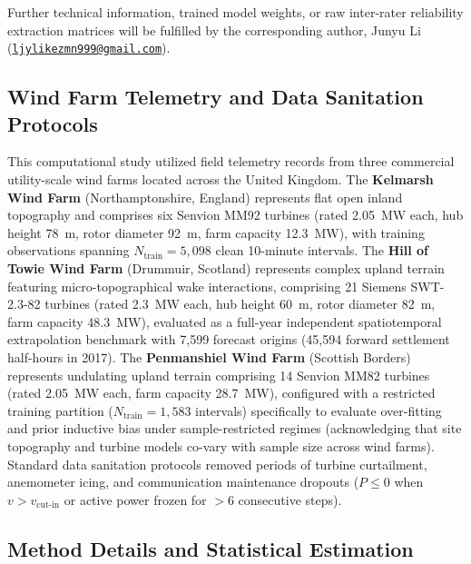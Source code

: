 Further technical information, trained model weights, or raw inter-rater reliability extraction matrices will be fulfilled by the corresponding author, Junyu Li (\href{mailto:ljylikezmn999@gmail.com}{\texttt{ljylikezmn999@gmail.com}}).

\subsection{Wind Farm Telemetry and Data Sanitation Protocols}
This computational study utilized field telemetry records from three commercial utility-scale wind farms located across the United Kingdom. The \textbf{Kelmarsh Wind Farm} (Northamptonshire, England) represents flat open inland topography and comprises six Senvion MM92 turbines (rated 2.05~MW each, hub height 78~m, rotor diameter 92~m, farm capacity 12.3~MW), with training observations spanning $N_{\text{train}} = 5,098$ clean 10-minute intervals. The \textbf{Hill of Towie Wind Farm} (Drummuir, Scotland) represents complex upland terrain featuring micro-topographical wake interactions, comprising 21 Siemens SWT-2.3-82 turbines (rated 2.3~MW each, hub height 60~m, rotor diameter 82~m, farm capacity 48.3~MW), evaluated as a full-year independent spatiotemporal extrapolation benchmark with 7,599 forecast origins (45,594 forward settlement half-hours in 2017). The \textbf{Penmanshiel Wind Farm} (Scottish Borders) represents undulating upland terrain comprising 14 Senvion MM82 turbines (rated 2.05~MW each, farm capacity 28.7~MW), configured with a restricted training partition ($N_{\text{train}} = 1,583$ intervals) specifically to evaluate over-fitting and prior inductive bias under sample-restricted regimes (acknowledging that site topography and turbine models co-vary with sample size across wind farms). Standard data sanitation protocols removed periods of turbine curtailment, anemometer icing, and communication maintenance dropouts ($P \le 0$ when $v > v_{\text{cut-in}}$ or active power frozen for $>6$ consecutive steps).

\subsection{Method Details and Statistical Estimation}

